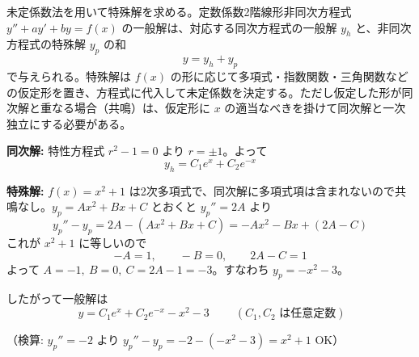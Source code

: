 
未定係数法を用いて特殊解を求める。定数係数2階線形非同次方程式 $y'' + a y' + b y = f(x)$ の一般解は、対応する同次方程式の一般解 $y_h$ と、非同次方程式の特殊解 $y_p$ の和
\[
y = y_h + y_p
\]
で与えられる。特殊解は $f(x)$ の形に応じて多項式・指数関数・三角関数などの仮定形を置き、方程式に代入して未定係数を決定する。ただし仮定した形が同次解と重なる場合（共鳴）は、仮定形に $x$ の適当なべきを掛けて同次解と一次独立にする必要がある。

\medskip
\noindent
\textbf{同次解:} 特性方程式 $r^{2} - 1 = 0$ より $r = \pm 1$。よって
\[
y_h = C_{1}e^{x} + C_{2}e^{-x}
\]

\noindent
\textbf{特殊解:} $f(x) = x^{2}+1$ は2次多項式で、同次解に多項式項は含まれないので共鳴なし。$y_p = Ax^{2}+Bx+C$ とおくと $y_p'' = 2A$ より
\[
y_p'' - y_p = 2A - (Ax^{2}+Bx+C) = -Ax^{2} - Bx + (2A - C)
\]
これが $x^{2}+1$ に等しいので
\[
-A = 1,\qquad -B = 0,\qquad 2A - C = 1
\]
よって $A=-1,\ B=0,\ C = 2A-1 = -3$。すなわち $y_p = -x^{2}-3$。

\noindent
したがって一般解は
\[
\boxed{\; y = C_{1}e^{x} + C_{2}e^{-x} - x^{2} - 3 \;}
\qquad (C_1, C_2 \text{ は任意定数})
\]

（検算: $y_p''=-2$ より $y_p''-y_p = -2-(-x^2-3) = x^2+1$ OK）
